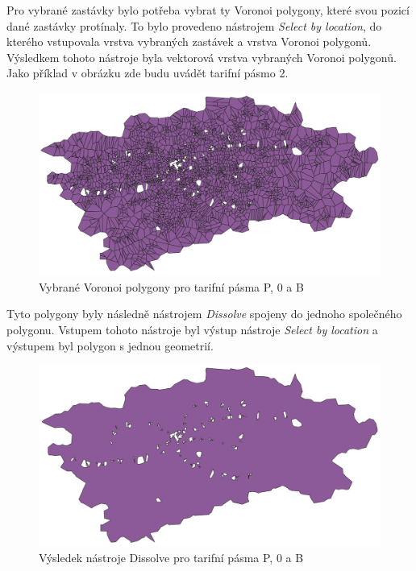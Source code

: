 Pro vybrané zastávky bylo potřeba vybrat ty Voronoi polygony, které svou
pozicí dané zastávky protínaly. To bylo provedeno nástrojem \textit{Select by location},
do kterého vstupovala vrstva vybraných zastávek a vrstva Voronoi polygonů. Výsledkem tohoto nástroje byla
vektorová vrstva vybraných Voronoi polygonů. Jako příklad v obrázku zde budu uvádět tarifní pásmo 2.

\begin{figure}[H] \centering
    \includegraphics[width=400pt]{./pictures/voronoi-selected-P0B.png}
    \caption[Vybrané Voronoi polygony pro tarifní pásma P, 0 a B]{Vybrané Voronoi polygony pro tarifní pásma P, 0 a B}
	\label{fig:voronoi-selected}              
\end{figure}

Tyto polygony byly následně nástrojem \textit{Dissolve} spojeny do jednoho společného polygonu.
Vstupem tohoto nástroje byl výstup nástroje \textit{Select by location} a výstupem byl polygon
s jednou geometrií. 

\begin{figure}[H] \centering
    \includegraphics[width=400pt]{./pictures/dissolve-P0B.png}
    \caption[Výsledek nástroje Dissolve pro tarifní pásma P, 0 a B]{Výsledek nástroje Dissolve pro tarifní pásma P, 0 a B}
	\label{fig:dissolve}              
\end{figure} 

